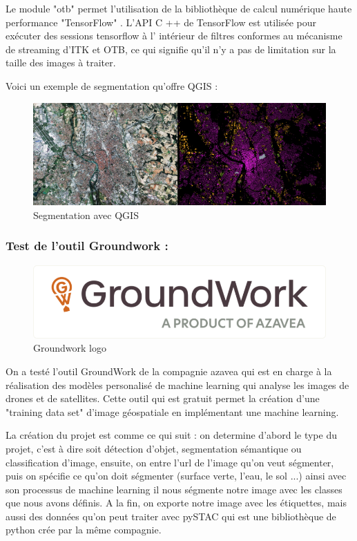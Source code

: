 \documentclass[12pt, openany]{report}
\begin{document}
Le module "otb" permet l'utilisation de la bibliothèque de calcul numérique haute performance "TensorFlow" . L'API C ++ de TensorFlow est utilisée pour exécuter des sessions tensorflow à l' intérieur de filtres conformes au mécanisme de streaming d'ITK et OTB, ce qui signifie qu'il n'y a pas de limitation sur la taille des images à traiter.


Voici un exemple de segmentation qu'offre QGIS :
\begin{figure}[ht]
\centering
\noindent
\includegraphics[width=1\textwidth]{test_segmentation.png}
\caption{Segmentation avec QGIS}
\end{figure}

\newpage
\subsubsection{Test de l'outil Groundwork :}
\begin{figure}[h]
\centering
\includegraphics[scale=0.4]{Groundwork.png}
\caption{Groundwork logo}
\end{figure}

On a testé l'outil GroundWork de la compagnie azavea qui est en charge à la réalisation des modèles personalisé de machine learning qui analyse les images de drones et de satellites.
Cette outil qui est gratuit permet la création d'une "training data set" d'image géospatiale en implémentant une machine learning.
\par
La création du projet est comme ce qui suit : on determine d'abord le type du projet, c'est à dire soit détection d'objet, segmentation sémantique ou classification d'image, ensuite, on entre l'url de l'image qu'on veut ségmenter, puis on spécifie ce qu'on doit ségmenter (surface verte, l'eau, le sol ...) ainsi avec son processus de machine learning il nous ségmente notre image avec les classes que nous avons définis.
A la fin, on exporte notre image avec les étiquettes, mais aussi des données qu'on peut traiter avec pySTAC qui est une bibliothèque de python crée par la même compagnie.
\end{document}
